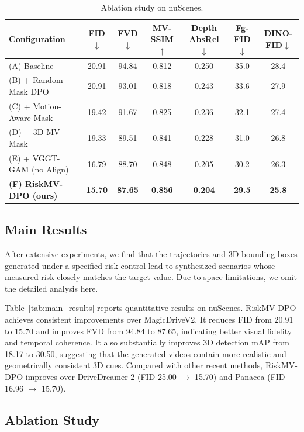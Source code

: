 \documentclass{article}
\begin{document}
\begin{table}[t]
\centering
\small
\setlength{\tabcolsep}{6pt}
\begin{tabular}{lcccccc}
\toprule
Configuration & FID$\downarrow$ & FVD$\downarrow$ & MV-SSIM$\uparrow$ & Depth AbsRel$\downarrow$ & Fg-FID$\downarrow$ & DINO-FID$\downarrow$ \\
\midrule
(A) Baseline & 20.91 & 94.84 & 0.812 & 0.250 & 35.0 & 28.4 \\
(B) + Random Mask DPO & 20.91 & 93.01 & 0.818 & 0.243 & 33.6 & 27.9 \\
(C) + Motion-Aware Mask & 19.42 & 91.67 & 0.825 & 0.236 & 32.1 & 27.4 \\
(D) + 3D MV Mask & 19.33 & 89.51 & 0.841 & 0.228 & 31.0 & 26.8 \\
(E) + VGGT-GAM (no Align) & 16.79 & 88.70 & 0.848 & 0.205 & 30.2 & 26.3 \\
\textbf{(F) RiskMV-DPO (ours)} & \textbf{15.70} & \textbf{87.65} & \textbf{0.856} & \textbf{0.204} & \textbf{29.5} & \textbf{25.8} \\
\bottomrule
\end{tabular}
\caption{Ablation study on nuScenes.}
\label{tab:ablation}
\end{table}


\subsection{Main Results}
\label{subsec:main_results}

After extensive experiments, we find that the trajectories and 3D bounding boxes generated under a specified risk control lead to synthesized scenarios whose measured risk closely matches the target value. Due to space limitations, we omit the detailed analysis here.

Table~\ref{tab:main_results} reports quantitative results on nuScenes.
RiskMV-DPO achieves consistent improvements over MagicDriveV2.
It reduces FID from 20.91 to 15.70 and improves FVD from 94.84 to 87.65, indicating better visual fidelity and temporal coherence.
It also substantially improves 3D detection mAP from 18.17 to 30.50, suggesting that the generated videos contain more realistic and geometrically consistent 3D cues.
Compared with other recent methods, RiskMV-DPO improves over DriveDreamer-2 (FID 25.00 $\rightarrow$ 15.70) and Panacea (FID 16.96 $\rightarrow$ 15.70).


\subsection{Ablation Study}
\label{subsec:ablation}
\end{document}
